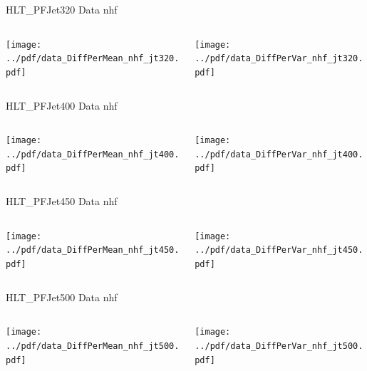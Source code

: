 \documentclass[9pt]{beamer}
\begin{document}
\begin{frame}[t]{HLT\_PFJet320 Data nhf}
\begin{columns}[T]
  \begin{column}{.5\textwidth}
  \texttt{[image: ../pdf/data\_DiffPerMean\_nhf\_jt320.pdf]}
  \end{column}
  \begin{column}{.5\textwidth}
  \texttt{[image: ../pdf/data\_DiffPerVar\_nhf\_jt320.pdf]}
  \end{column}
\end{columns}
\end{frame}

\begin{frame}[t]{HLT\_PFJet400 Data nhf}
\begin{columns}[T]
  \begin{column}{.5\textwidth}
  \texttt{[image: ../pdf/data\_DiffPerMean\_nhf\_jt400.pdf]}
  \end{column}
  \begin{column}{.5\textwidth}
  \texttt{[image: ../pdf/data\_DiffPerVar\_nhf\_jt400.pdf]}
  \end{column}
\end{columns}
\end{frame}

\begin{frame}[t]{HLT\_PFJet450 Data nhf}
\begin{columns}[T]
  \begin{column}{.5\textwidth}
  \texttt{[image: ../pdf/data\_DiffPerMean\_nhf\_jt450.pdf]}
  \end{column}
  \begin{column}{.5\textwidth}
  \texttt{[image: ../pdf/data\_DiffPerVar\_nhf\_jt450.pdf]}
  \end{column}
\end{columns}
\end{frame}

\begin{frame}[t]{HLT\_PFJet500 Data nhf}
\begin{columns}[T]
  \begin{column}{.5\textwidth}
  \texttt{[image: ../pdf/data\_DiffPerMean\_nhf\_jt500.pdf]}
  \end{column}
  \begin{column}{.5\textwidth}
  \texttt{[image: ../pdf/data\_DiffPerVar\_nhf\_jt500.pdf]}
  \end{column}
\end{columns}
\end{frame}
\end{document}
